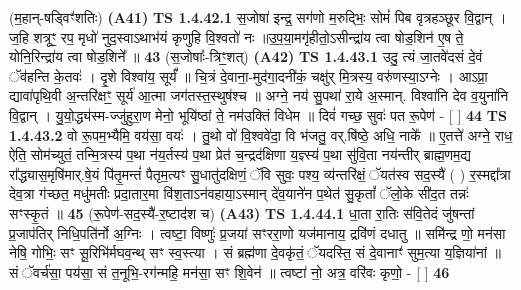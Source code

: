 \documentclass[17pt]{extarticle}
\begin{document}
                  \newline
                       (म॒हान्-षड्विꣳ॑शतिः)  \textbf{(A41)} \newline \newline
                                        \textbf{ TS 1.4.42.1} \newline
                  स॒जोषा॑ इन्द्र॒ सग॑णो म॒रुद्भिः॒ सोमं॑ पिब वृत्रहञ्छूर वि॒द्वान् । ज॒हि शत्रूꣳ॒॒ रप॒ मृधो॑ नुद॒स्वाऽथाभ॑यं कृणुहि वि॒श्वतो॑ नः ॥उ॒प॒या॒मगृ॑हीतो॒ऽसीन्द्रा॑य त्वा षोड॒शिन॑ ए॒ष ते॒ योनि॒रिन्द्रा॑य त्वा षोड॒शिने᳚ ॥ \textbf{  43} \newline
                  \newline
                      (स॒जोषाः᳚-त्रिꣳ॒॒शत्)  \textbf{(A42)} \newline \newline
                                        \textbf{ TS 1.4.43.1} \newline
                  उदु॒ त्यं जा॒तवे॑दसं दे॒वं ॅव॑हन्ति के॒तवः॑ । दृ॒शे विश्वा॑य॒ सूर्यं᳚ ॥ चि॒त्रं दे॒वाना॒-मुद॑गा॒दनी॑कं॒ चक्षु॑र् मि॒त्रस्य॒ वरु॑णस्या॒ऽग्नेः । आऽप्रा॒ द्यावा॑पृथि॒वी अ॒न्तरि॑क्षꣳ॒॒ सूर्य॑ आ॒त्मा जग॑तस्त॒स्थुष॑श्च ॥ अग्ने॒ नय॑ सु॒पथा॑ रा॒ये अ॒स्मान्. विश्वा॑नि देव व॒युना॑नि वि॒द्वान् । यु॒यो॒द्ध्य॑स्म-ज्जु॑हुरा॒ण मेनो॒ भूयि॑ष्ठां ते॒ नम॑उक्तिं विधेम ॥ दिवं॑ गच्छ॒ सुवः॑ पत रू॒पेण॑ - [ ] \textbf{  44} \newline
                  \newline
                                \textbf{ TS 1.4.43.2} \newline
                  वो रू॒पम॒भ्यैमि॒ वय॑सा॒ वयः॑ । तु॒थो वो॑ वि॒श्ववे॑दा॒ वि भ॑जतु॒ वर्.षि॑ष्ठे॒ अधि॒ नाके᳚ ॥ ए॒तत्ते॑ अग्ने॒ राध॒ ऐति॒ सोम॑च्युतं॒ तन्मि॒त्रस्य॑ प॒था न॑य॒र्तस्य॑ प॒था प्रेत॑ च॒न्द्रद॑क्षिणा य॒ज्ञ्स्य॑ प॒था सु॑वि॒ता नय॑न्तीर् ब्राह्म॒णम॒द्य रा᳚द्ध्यास॒मृषि॑मार्.षे॒यं पि॑तृ॒मन्तं॑ पैतृम॒त्यꣳ सु॒धातु॑दक्षिणं॒ ॅवि सुवः॒ पश्य॒ व्य॑न्तरि॑क्षं॒ ॅयत॑स्व सद॒स्यै॑ ( ) र॒स्मद्दा᳚त्रा देव॒त्रा ग॑च्छत॒ मधु॑मतीः प्रदा॒तार॒मा वि॑श॒ताऽन॑वहाया॒ऽस्मान् दे॑व॒याने॑न प॒थेत॑ सु॒कृतां᳚ ॅलो॒के सी॑द॒त तन्नः॑ सꣳस्कृ॒तं ॥ \textbf{  45 } \newline
                  \newline
                       (रू॒पेण॑-सद॒स्यै॑-र॒ष्टाद॑श च)  \textbf{(A43)} \newline \newline
                                        \textbf{ TS 1.4.44.1} \newline
                  धा॒ता रा॒तिः स॑वि॒तेदं जु॑षन्तां प्र॒जाप॑तिर् निधि॒पति॑र्नो अ॒ग्निः । त्वष्टा॒ विष्णुः॑ प्र॒जया॑ सꣳररा॒णो यज॑मानाय॒ द्रवि॑णं दधातु ॥ समि॑न्द्र णो॒ मन॑सा नेषि॒ गोभिः॒ सꣳ सू॒रिभि॑र्मघव॒न्थ् सꣳ स्व॒स्त्या । सं ब्रह्म॑णा दे॒वकृ॑तं॒ ॅयदस्ति॒ सं दे॒वानाꣳ॑ सुम॒त्या य॒ज्ञिया॑नां ॥ सं ॅवर्च॑सा॒ पय॑सा॒ सं त॒नूभि॒-रग॑न्महि॒ मन॑सा॒ सꣳ शि॒वेन॑ ॥ त्वष्टा॑ नो॒ अत्र॒ वरि॑वः कृणो॒ - [ ] \textbf{  46} \newline
\end{document}
